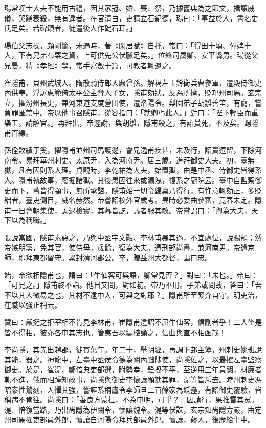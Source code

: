 \begin{pinyinscope}
 瑒常嘆士大夫不能用古禮，因其家冠、婚、喪、祭，乃據舊典為之節文，揖讓威儀，哭踴衰殺，無有違者。在官清白，吏請立石紀德，瑒曰：「事益於人，書名史氏足矣。若碑頌者，徒遣後人作碇石耳。」



 瑒伯父志操，頗剛簡，未遇時，著《閑居賦》自托，常曰：「得田十頃、僮婢十人，下有兄弟布粟之資，上可供先公伏臘足矣。」位終司屬卿、安平縣男。瑒從父兄晏，精《孝經》學，常手寫數十篇，可教者輒遺之。



 崔隱甫，貝州武城人。隋散騎侍郎人麃曾孫。解褐左玉鈐衛兵曹參軍，遷殿侍御史內供奉。浮屠惠範倚太平公主脅人子女，隱甫劾狀，反為所擠，貶邛州司馬。玄宗立，擢汾州長史，兼河東道支度營田使，遷洛陽令。梨園弟子胡雛善笛，有寵，嘗負罪匿禁中。帝以他事召隱甫，從容指曰：「就卿丐此人。」對曰：「陛下輕臣而重樂工，請解官。」再拜出，帝遽謝，與胡雛，隱甫殺之，有詔貰死，不及矣。賜隱甫百縑。



 孫佺敗績于奚，擢隱甫並州司馬護邊，會兄逸甫疾甚，未及行，詔責逗留，下除河南令。累拜華州刺史、太原尹，入為河南尹。居三歲，進拜御史大夫。初，臺無獄，凡有囚則系大理。貞觀時，李乾祐為大夫，始置獄，由是中丞、侍御史皆得系人。隱甫執故事，廢掘諸獄。其後患囚往來或漏洩，復系之廚院云。臺中自監察御史而下，舊皆得顓事，無所承諮。隱甫始一切令歸稟乃得行，有忤意輒劾正，多貶絀者，臺吏側目，威名赫然。帝嘗詔校外官歲考。異時必委曲參審，竟春未定。隱甫一日會朝集使，詢逮檢實，其暮皆訖，議者服其敏。帝嘗謂曰：「卿為大夫，天下以為稱職。」



 張說當國，隱甫素惡之，乃與中丞宇文融、李林甫暴其過，不宜處位，說賜罷；然帝嫉朋黨，免其官，使侍母。歲餘，復為大夫。遷刑部尚書，兼河南尹。帝還京師，即拜東都留守。累封清河郡公。卒，贈益州大都督，謚曰忠。



 始，帝欲相隱甫也，謂曰：「牛仙客可與語，卿常見否？」對曰：「未也。」帝曰：「可見之。」隱甫終不詣。他日又問，對如初。帝乃不用。子弟或問故，答曰：「吾不以其人微易之也，其材不逮中人，可與之對耶？」隱甫所至絜介自守，明吏治，在職以強正稱云。



 贊曰：嚴挺之拒宰相不肯見李林甫，崔隱甫違詔不屈牛仙客，信剛者乎！二人坐是皆不得相，彼亦各申其志也。管夷吾以編棧諭之，信曲與直不相函哉！



 李尚隱，其先出趙郡，徙貫萬年。年二十，舉明經，再調下邽主簿，州刺史姚班說其能，器之。神龍中，左臺中丞侯令德為關內黜陟使，尚隱佐之，以最擢左臺監察御史。於是，崔湜、鄭愔典吏部選，附勢幸，銓擬不平，至逆用三年員闕，材廉者軋不進，俄而相踵知政事，尚隱與御史李懷讓顯劾其罪，湜等皆斥去。睦州刺史馮昭泰性鷙刻，人憚其強，嘗誣系桐廬令李師旦二百餘家為妖蠱，有詔御史覆驗，皆稱病不肯往。尚隱曰：「善良方蒙枉，不為申明，可乎？」因請行，果推雪其冤。湜、愔復當路，乃出尚隱為伊闕令，懷讓魏令。湜等伏誅，玄宗知尚隱方嚴，由定州司馬擢吏部員外郎，懷讓自河陽令拜兵部員外郎。懷讓，蓚人，後歷給事中。




\end{pinyinscope}
